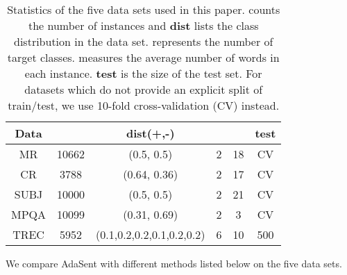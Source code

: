 \documentclass{article}
\theoremstyle{definition}
\begin{document}
\begin{table}[htb]
\centering
\begin{tabular}{c||c|c|c|c|c}\hline
\textbf{Data} &  & \textbf{dist}(+,-) &  &  & \textbf{test}\\\hline
MR & 10662 & (0.5, 0.5) & 2 & 18 & CV \\
CR & 3788 & (0.64, 0.36) & 2 & 17 & CV \\
SUBJ & 10000 & (0.5, 0.5) & 2 & 21 & CV \\
MPQA & 10099 & (0.31, 0.69) & 2 & 3 & CV \\
TREC & 5952 & \footnotesize{(0.1,0.2,0.2,0.1,0.2,0.2)} & 6 & 10 & 500 \\\hline
\end{tabular}
\caption{Statistics of the five data sets used in this paper.  counts the number of instances and \textbf{dist} lists the class distribution in the data set.  represents the number of target classes.  measures the average number of words in each instance. \textbf{test} is the size of the test set. For datasets which do not provide an explicit split of train/test, we use 10-fold cross-validation (CV) instead.}
\label{table:dataset}
\end{table}
We compare AdaSent with different methods listed below on the five data sets.
\end{document}
